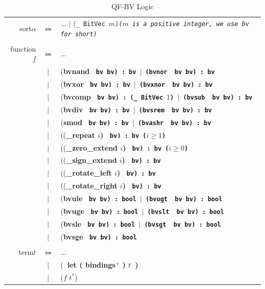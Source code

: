 \documentclass[10pt,letter]{article}
\theoremstyle{definition}
\begin{document}
\begin{table}[!h]
\begin{mdframed}
\centering
\begin{tabular}{r c l}
sort\qquad $\alpha$ & $\Coloneqq$ & $\ldots$ $\mid$ \rm(\tt \_\ BitVec $m$\rm)\it\quad \rm($m$ \rm is a positive integer, we use {\tt bv} for short) \\
\\
function\qquad $f$ & $\Coloneqq$ & $\ldots$ \\
& $\mid$ & (\bf bvnand \tt\ bv bv\rm) : \tt bv \rm$\mid$ (\bf bvnor \tt\ bv bv\rm) : \tt bv \\
& $\mid$ & (\bf bvxor \tt\ bv bv\rm) : \tt bv \rm$\mid$ (\bf bvxnor \tt\ bv bv\rm) : \tt bv \\
& $\mid$ & (\bf bvcomp \tt\ bv bv\rm) : \rm(\tt \_\ BitVec $1$\rm) $\mid$ (\bf bvsub \tt\ bv bv\rm) : \tt bv \\
& $\mid$ & (\bf bvdiv \tt\ bv bv\rm) : \tt bv \rm$\mid$ (\bf bvsrem \tt\ bv bv\rm) : \tt bv \\
& $\mid$ & (\bf smod \tt\ bv bv\rm) : \tt bv \rm$\mid$ (\bf bvashr \tt\ bv bv\rm) : \tt bv \\
& $\mid$ & ((\bf\_repeat $i$\rm) \tt\ bv\rm) : \tt bv \qquad($i \geqslant 1$)\\
& $\mid$ & ((\bf\_zero\_extend $i$\rm) \tt\ bv\rm) : \tt bv \qquad($i \geqslant 0$)\\
& $\mid$ & ((\bf\_sign\_extend $i$\rm) \tt\ bv\rm) : \tt bv \\
& $\mid$ & ((\bf\_rotate\_left $i$\rm) \tt\ bv\rm) : \tt bv \\
& $\mid$ & ((\bf\_rotate\_right $i$\rm) \tt\ bv\rm) : \tt bv \\
& $\mid$ & (\bf bvule \tt\ bv bv\rm) : \tt bool \rm$\mid$ (\bf bvugt \tt\ bv bv\rm) : \tt bool \\
& $\mid$ & (\bf bvuge \tt\ bv bv\rm) : \tt bool \rm$\mid$ (\bf bvslt \tt\ bv bv\rm) : \tt bool \\
& $\mid$ & (\bf bvsle \tt\ bv bv\rm) : \tt bool \rm$\mid$ (\bf bvsgt \tt\ bv bv\rm) : \tt bool \\
& $\mid$ & (\bf bvsge \tt\ bv bv\rm) : \tt bool \\
\\
term\qquad $t$ & $\Coloneqq$ & $\ldots$ \\
& $\mid$ & (\bf\ let \rm ( bindings$^+$ ) $t$\ )\\
& $\mid$ & ($f$ $t^*$)\\
\end{tabular}
\end{mdframed}
\caption{QF-BV Logic}
\end{table}
\end{document}
